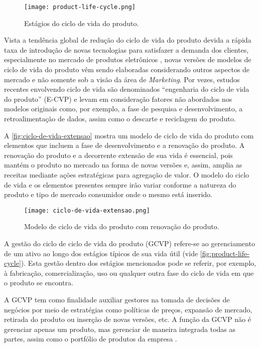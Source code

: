 \begin{figure}[htb]
	\centering
	\texttt{[image: product-life-cycle.png]}
	\caption{Estágios do ciclo de vida do produto.}
	\label{fig:product-life-cycle}
\end{figure}

Vista a tendência global de redução do ciclo de vida do produto devida a rápida taxa de introdução de novas tecnologias para satisfazer a demanda dos clientes, especialmente no mercado de produtos eletrônicos \cite{trappey2008lifecycle}, novas versões de modelos de ciclo de vida do produto vêm sendo elaboradas considerando outros aspectos de mercado e não somente sob a visão da área de \textit{Marketing}. Por vezes, estudos recentes envolvendo ciclo de vida são denominados ``engenharia do ciclo de vida do produto'' (E-CVP) \cite{cao2012lifecycle} e levam em consideração fatores não abordados nos modelos originais como, por exemplo, a fase de pesquisa e desenvolvimento, a retroalimentação de dados, assim como o descarte e reciclagem do produto.

A \autoref{fig:ciclo-de-vida-extensao} mostra um modelo de ciclo de vida do produto com elementos que incluem a fase de desenvolvimento e a renovação do produto. A renovação do produto e a decorrente extensão de sua vida é essencial, pois mantém o produto no mercado na forma de novas versões e, assim, amplia as receitas mediante ações estratégicas para agregação de valor. O modelo do ciclo de vida e os elementos presentes sempre irão variar conforme a natureza do produto e tipo de mercado consumidor onde o mesmo está inserido.

\begin{figure}[htb]
	\centering
	\texttt{[image: ciclo-de-vida-extensao.png]}
	\caption{Modelo de ciclo de vida do produto com renovação do produto.}
	\label{fig:ciclo-de-vida-extensao}
\end{figure}

A gestão do ciclo de ciclo de vida do produto (GCVP) refere-se ao gerenciamento de um ativo ao longo dos estágios típicos de sua vida útil (vide \autoref{fig:product-life-cycle}). Esta gestão dentro dos estágios mencionados pode se referir, por exemplo, à fabricação, comercialização, uso ou qualquer outra fase do ciclo de vida em que o produto se encontra.

A GCVP tem como finalidade auxiliar gestores na tomada de decisões de negócios por meio de estratégias como políticas de preços, expansão de mercado, retirada do produto ou inserção de novas versões, etc. A função da GCVP não é gerenciar apenas um produto, mas gerenciar de maneira integrada todas as partes, assim como o portfólio de produtos da empresa \cite{stark2015lifecycle}.

